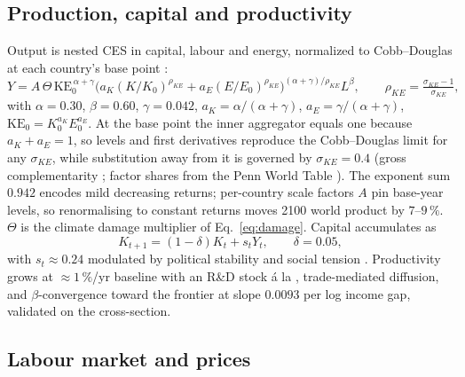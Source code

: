\documentclass[12pt,a4paper]{article}
\begin{document}
\subsection{Production, capital and productivity}

Output is nested CES in capital, labour and energy, normalized to Cobb--Douglas at each
country's base point \citep{arrow1961}:
\begin{equation}
Y = A\,\Theta\,\mathrm{KE}_0^{\,\alpha+\gamma}
    \big(a_K (K/K_0)^{\rho_{KE}} + a_E (E/E_0)^{\rho_{KE}}\big)^{(\alpha+\gamma)/\rho_{KE}}
    L^{\beta},
\qquad \rho_{KE} = \tfrac{\sigma_{KE}-1}{\sigma_{KE}},
\label{eq:ces}
\end{equation}
with $\alpha=0.30$, $\beta=0.60$, $\gamma=0.042$, $a_K=\alpha/(\alpha+\gamma)$,
$a_E=\gamma/(\alpha+\gamma)$, $\mathrm{KE}_0=K_0^{a_K}E_0^{a_E}$. At the base point the inner
aggregator equals one because $a_K+a_E=1$, so levels and first derivatives reproduce the
Cobb--Douglas limit for any $\sigma_{KE}$, while substitution away from it is governed by
$\sigma_{KE}=0.4$ (gross complementarity \citep{vanderwerf2008,koetse2008}; factor shares from
the Penn World Table \citep{feenstra2015,gollin2002}). The exponent sum $0.942$ encodes mild
decreasing returns; per-country scale factors $A$ pin base-year levels, so renormalising to
constant returns moves 2100 world product by $7$--$9\,\%$. $\Theta$ is the climate damage
multiplier of Eq.~\ref{eq:damage}. Capital accumulates as
\begin{equation}
K_{t+1}=(1-\delta)K_t+s_t Y_t,\qquad \delta=0.05,
\label{eq:capital}
\end{equation}
with $s_t \approx 0.24$ modulated by political stability and social tension
\citep{mody2012}. Productivity grows at ${\approx}1\,\%$/yr baseline with an R\&D stock
\'a la \citet{jones1995}, trade-mediated diffusion, and $\beta$-convergence toward the frontier
at slope $0.0093$ per log income gap, validated on the cross-section.

\subsection{Labour market and prices}
\end{document}
